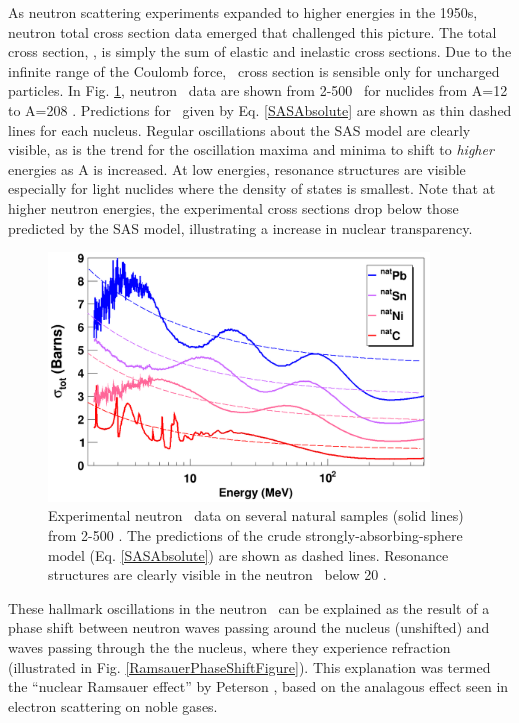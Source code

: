 As neutron scattering experiments expanded to higher energies in the 1950s, 
neutron total cross section data emerged that challenged this picture. The total
cross section, \tot, is simply the sum of elastic and inelastic cross sections.
Due to the infinite range of the Coulomb force, \tot\ cross section is sensible only for
uncharged particles. In Fig.
\ref{SASphereVsExperiment}, neutron \tot\ data are shown from 2-500
\mega\electronvolt\ for nuclides from A=12 to A=208 \cite{Finlay1993, Schwartz1974, Poenitz1983, Abfalterer2000, 
Abfalterer2001}. Predictions for \tot\ given by Eq. \ref{SASAbsolute} are shown as thin dashed 
lines for each nucleus. Regular oscillations about the SAS model are clearly
visible, as is the trend for the oscillation maxima and minima to shift to \textit{higher}
energies as 
A is increased. At low energies, resonance structures are visible especially for light nuclides 
where the density of states is smallest. Note that at higher neutron energies, the experimental
cross sections drop below those predicted by the SAS model, illustrating
a increase in nuclear transparency.
\begin{figure}[tb]
    \centering
    \includegraphics[width=0.9\textwidth]{figures/SASphereVsExperiment.png}
    \caption[Experimental neutron \tot\ data and strongly-absorbing-sphere predictions]
    {
        Experimental neutron \tot\ data on several natural samples (solid lines)
        from 2-500 \mega\electronvolt. The predictions of the crude strongly-absorbing-sphere
        model (Eq. \ref{SASAbsolute}) are shown as dashed lines. Resonance structures are
        clearly visible in the \cNat neutron \tot\ below 20 \mega\electronvolt.
    }
    \label{SASphereVsExperiment}
\end{figure}
These hallmark oscillations in the neutron \tot\ can be explained as the result
of a phase shift between 
neutron waves passing around the nucleus (unshifted) and waves passing
through the the nucleus, where they experience refraction
(illustrated in Fig. \ref{RamsauerPhaseShiftFigure}). This explanation was termed the ``nuclear 
Ramsauer effect'' by Peterson \cite{Peterson1962}, based on the analagous effect seen in 
electron scattering on noble gases.

